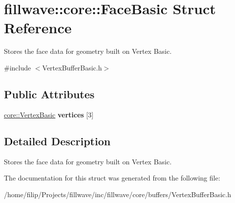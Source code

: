 \hypertarget{structfillwave_1_1core_1_1FaceBasic}{}\section{fillwave\+:\+:core\+:\+:Face\+Basic Struct Reference}
\label{structfillwave_1_1core_1_1FaceBasic}


Stores the face data for geometry built on Vertex Basic.  




{\ttfamily \#include $<$Vertex\+Buffer\+Basic.\+h$>$}

\subsection*{Public Attributes}
\begin{DoxyCompactItemize}
\item 
\hypertarget{structfillwave_1_1core_1_1FaceBasic_acba94f7799b27b0e0ce319af3d706e15}{}\hyperlink{structfillwave_1_1core_1_1VertexBasic}{core\+::\+Vertex\+Basic} {\bfseries vertices} \mbox{[}3\mbox{]}\label{structfillwave_1_1core_1_1FaceBasic_acba94f7799b27b0e0ce319af3d706e15}

\end{DoxyCompactItemize}


\subsection{Detailed Description}
Stores the face data for geometry built on Vertex Basic. 

The documentation for this struct was generated from the following file\+:\begin{DoxyCompactItemize}
\item 
/home/filip/\+Projects/fillwave/inc/fillwave/core/buffers/Vertex\+Buffer\+Basic.\+h\end{DoxyCompactItemize}
